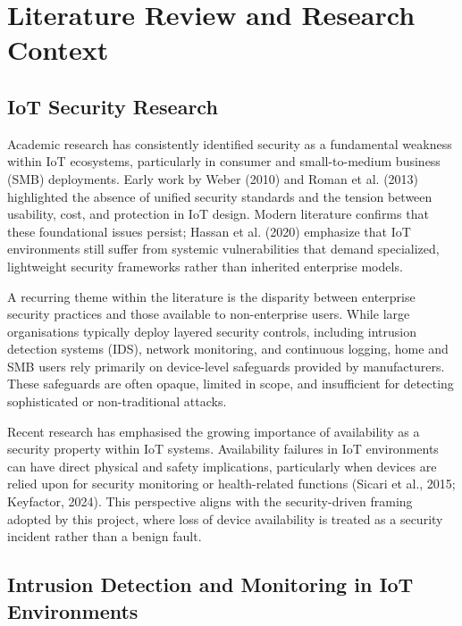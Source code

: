 \chapter{Literature Review and Research Context}
\label{ch:lit}

\section{IoT Security Research}

Academic research has consistently identified security as a fundamental weakness within IoT ecosystems, particularly in consumer and small-to-medium business (SMB) deployments. Early work by Weber (2010) and Roman et al. (2013) highlighted the absence of unified security standards and the tension between usability, cost, and protection in IoT design. Modern literature confirms that these foundational issues persist; Hassan et al. (2020) emphasize that IoT environments still suffer from systemic vulnerabilities that demand specialized, lightweight security frameworks rather than inherited enterprise models.

A recurring theme within the literature is the disparity between enterprise security practices and those available to non-enterprise users. While large organisations typically deploy layered security controls, including intrusion detection systems (IDS), network monitoring, and continuous logging, home and SMB users rely primarily on device-level safeguards provided by manufacturers. These safeguards are often opaque, limited in scope, and insufficient for detecting sophisticated or non-traditional attacks.

Recent research has emphasised the growing importance of availability as a security property within IoT systems. Availability failures in IoT environments can have direct physical and safety implications, particularly when devices are relied upon for security monitoring or health-related functions (Sicari et al., 2015; Keyfactor, 2024). This perspective aligns with the security-driven framing adopted by this project, where loss of device availability is treated as a security incident rather than a benign fault.

\section{Intrusion Detection and Monitoring in IoT Environments}

